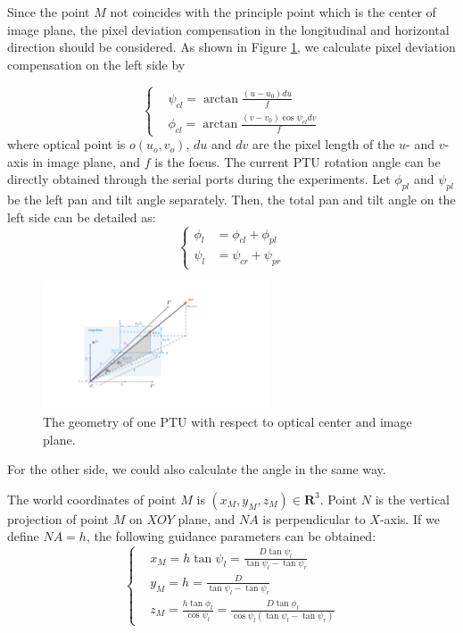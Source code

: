 \documentclass[journal,article,submit,moreauthors,pdftex,10pt,a4paper]{mdpi}
\begin{document}
Since the point ${M}$ not coincides with the principle point which is the center of image plane, the pixel deviation compensation in the longitudinal and horizontal direction should be considered. As shown in Figure  \ref{fig:Fig02_ImagePlaneOnly}, we calculate pixel deviation compensation on the left side by 

\begin{equation} 
\left \{
\begin{split}
& \psi_{cl} = \arctan \frac{(u-u_0)du}{f} \\
& \phi_{cl} = \arctan \frac{(v-v_0)\cos\psi_{cl}dv}{f} 
\end{split}
\right.
\end{equation}
where optical point is $o(u_o,v_o)$, $du$ and $dv$ are the pixel length of the $u$- and $v$-axis in image plane, and $f$ is the focus. The current PTU rotation angle can be directly obtained through the serial ports during the experiments. Let $\phi_{pl}$ and $\psi_{pl}$ be the left pan and tilt angle separately. Then, the total pan and tilt angle on the left side can be detailed as:
\begin{equation} 
\left \{
\begin{split}
\phi_l &= \phi_{cl} + \phi_{pl} \\ 
\psi_l &= \psi_{cr} + \psi_{pr}
\end{split}
\right.
\end{equation}

\begin{figure}[!th]
	\centering
	\includegraphics[width=0.6\textwidth]{Figs/chp03_vision_02_image_plane.pdf}
	\caption{The geometry of one PTU with respect to optical center and image plane.}
	\label{fig:Fig02_ImagePlaneOnly}
\end{figure}

For the other side, we could also calculate the angle in the same way. 

The world coordinates of point ${M}$ is $(x_M, y_M, z_M)\in \textbf{R}^3 $. Point $N$ is the vertical projection of point $M$ on $XOY$ plane, and $NA$ is perpendicular to $X$-axis. If we define $NA = h$, the following guidance parameters can be obtained:
\begin{equation}
\left \{
\begin{aligned}
&x_M = h \tan \psi_l = \frac{D\tan \psi_l}{\tan \psi_l - \tan \psi_r}            \\
&y_M = h = \frac{D}{\tan \psi_l - \tan \psi_r} \\
&z_M = \frac{h\tan \phi_l}{\cos \psi_l} = \frac{D\tan \phi_l}{\cos \psi_l(\tan \psi_l - \tan \psi_r)}
\end{aligned} \right.
\label{eq:M_Positon_Equation}
\end{equation} 
\end{document}
